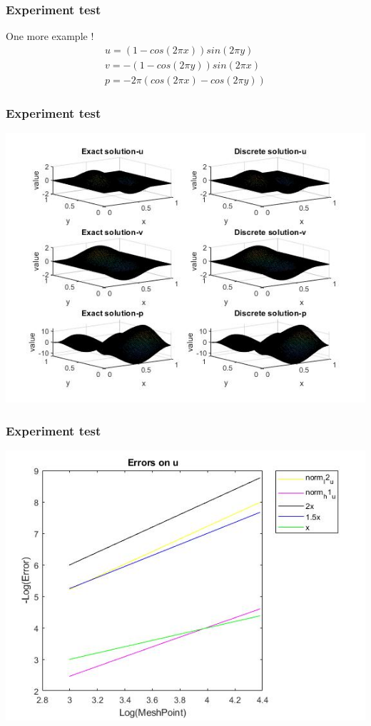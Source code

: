 \documentclass[11pt]{beamer}
\numberwithin{equation}{section}
\theoremstyle{plain}
\theoremstyle{definition}
\theoremstyle{remark}
\begin{document}
\begin{frame}\frametitle{Experiment test}
One more example ! 
\begin{align*}
u=(1-cos(2\pi x))sin(2 \pi y) \\
v=-(1-cos(2\pi y))sin(2 \pi x) \\
p=-2\pi(cos(2\pi x)-cos(2\pi y)) 
\end{align*}
\end{frame}
\begin{frame}\frametitle{Experiment test}
\begin{center}
\includegraphics[scale=0.45]{6}
\end{center}
\end{frame}
\begin{frame}\frametitle{Experiment test}
\includegraphics[scale=0.5]{7}
\end{frame}
\end{document}
